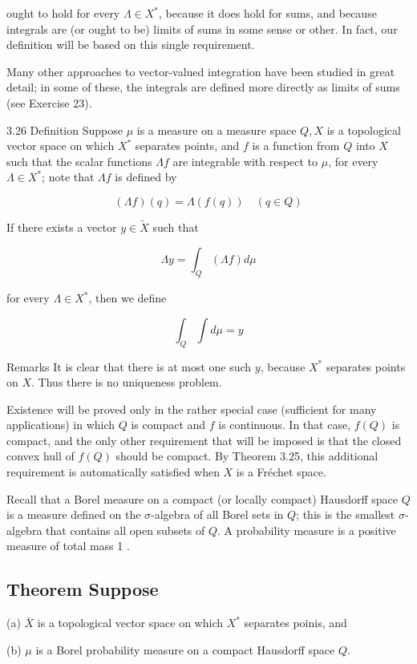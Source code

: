 \documentclass[10pt]{article}
\begin{document}
ought to hold for every $\Lambda \in X^{*}$, because it does hold for sums, and because integrals are (or ought to be) limits of sums in some sense or other. In fact, our definition will be based on this single requirement.

Many other approaches to vector-valued integration have been studied in great detail; in some of these, the integrals are defined more directly as limits of sums (see Exercise 23).

3.26 Definition Suppose $\mu$ is a measure on a measure space $Q, X$ is a topological vector space on which $X^{*}$ separates points, and $f$ is a function from $Q$ into $X$ such that the scalar functions $\Lambda f$ are integrable with respect to $\mu$, for every $\Lambda \in X^{*}$; note that $\Lambda f$ is defined by

$$
(\Lambda f)(q)=\Lambda(f(q)) \quad(q \in Q)
$$

If there exists a vector $y \in \widetilde{X}$ such that

$$
\Lambda y=\int_{\underline{Q}}(\Lambda f) d \mu
$$

for every $\Lambda \in X^{*}$, then we define

$$
\int_{Q} \int d \mu=y
$$

Remarks It is clear that there is at most one such $y$, because $X^{*}$ separates points on $X$. Thus there is no uniqueness problem.

Existence will be proved only in the rather special case (sufficient for many applications) in which $Q$ is compact and $f$ is continuous. In that case, $f(Q)$ is compact, and the only other requirement that will be imposed is that the closed convex hull of $f(Q)$ should be compact. By Theorem 3.25, this additional requirement is automatically satisfied when $X$ is a Fréchet space.

Recall that a Borel measure on a compact (or locally compact) Hausdorff space $Q$ is a measure defined on the $\sigma$-algebra of all Borel sets in $Q$; this is the smallest $\sigma$-algebra that contains all open subsets of $Q$. A probability measure is a positive measure of total mass 1 .

\subsection{Theorem Suppose}
(a) $\bar{X}$ is a topological vector space on which $X^{*}$ separates poinis, and

(b) $\mu$ is a Borel probability measure on a compact Hausdorff space $Q$.
\end{document}
